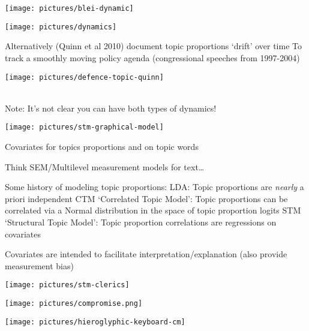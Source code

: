 \documentclass{mediumfoils}
\begin{document}
\centerline{\texttt{[image: pictures/blei-dynamic]}}


\centerline{\texttt{[image: pictures/dynamics]}}


Alternatively (Quinn et al 2010) document topic proportions `drift' over time 
\ita
\itm To track a smoothly moving policy agenda (congressional speeches from 1997-2004)
\itz

\centerline{\texttt{[image: pictures/defence-topic-quinn]}}

~\\
Note:
\ita
\itm It's not clear you can have both types of dynamics!
\itz


\centerline{\texttt{[image: pictures/stm-graphical-model]}}

Covariates for topics proportions and on topic words


Think SEM/Multilevel measurement models for text\ldots  

Some history of modeling topic proportions:
\ita
\itm LDA: Topic proportions are \textit{nearly} a priori independent 
\itm CTM `Correlated Topic Model': Topic proportions can be correlated via a Normal distribution in the space of topic proportion logits
\itm STM `Structural Topic Model': Topic proportion correlations are regressions on covariates 
\itz

Covariates are intended to facilitate interpretation/explanation (also provide measurement bias)


\centerline{\texttt{[image: pictures/stm-clerics]}}


\centerline{\texttt{[image: pictures/compromise.png]}}

\slide{}


\centerline{\texttt{[image: pictures/hieroglyphic-keyboard-cm]}}
\end{document}
